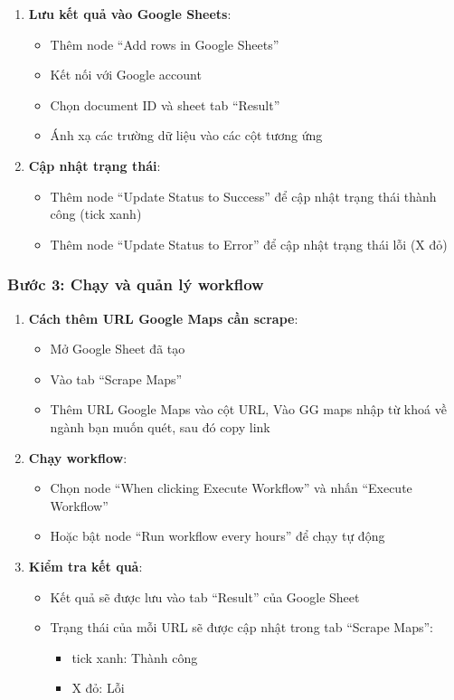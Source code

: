 \begin{enumerate}
  \item \textbf{Lưu kết quả vào Google Sheets}:
  \begin{itemize}
    \item Thêm node ``Add rows in Google Sheets''
    \item Kết nối với Google account
    \item Chọn document ID và sheet tab ``Result''
    \item Ánh xạ các trường dữ liệu vào các cột tương ứng
  \end{itemize}

  \item \textbf{Cập nhật trạng thái}:
  \begin{itemize}
    \item Thêm node ``Update Status to Success'' để cập nhật trạng thái thành công (tick xanh)
    \item Thêm node ``Update Status to Error'' để cập nhật trạng thái lỗi (X đỏ)
  \end{itemize}
\end{enumerate}

\subsubsection{Bước 3: Chạy và quản lý workflow}

\begin{enumerate}
  \item \textbf{Cách thêm URL Google Maps cần scrape}:
  \begin{itemize}
    \item Mở Google Sheet đã tạo
    \item Vào tab ``Scrape Maps''
    \item Thêm URL Google Maps vào cột URL, Vào GG maps nhập từ khoá về ngành bạn muốn quét, sau đó copy link 
  \end{itemize}

  \item \textbf{Chạy workflow}:
  \begin{itemize}
    \item Chọn node ``When clicking Execute Workflow'' và nhấn ``Execute Workflow''
    \item Hoặc bật node ``Run workflow every hours'' để chạy tự động
  \end{itemize}

  \item \textbf{Kiểm tra kết quả}:
  \begin{itemize}
    \item Kết quả sẽ được lưu vào tab ``Result'' của Google Sheet
    \item Trạng thái của mỗi URL sẽ được cập nhật trong tab ``Scrape Maps'':
    \begin{itemize}
      \item tick xanh: Thành công
      \item X đỏ: Lỗi
    \end{itemize}
  \end{itemize}
\end{enumerate}

